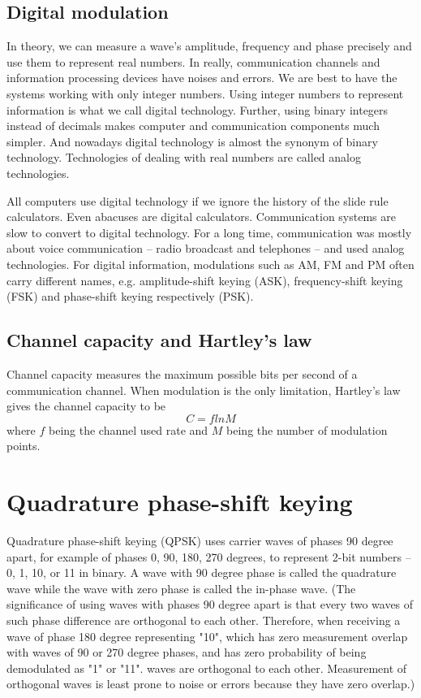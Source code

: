 \documentclass{book}
\begin{document}
\subsection{Digital modulation}
In theory, we can measure a wave's amplitude, frequency and phase precisely and use them to represent real numbers. In really, communication channels and information processing devices have noises and errors. We are best to have the systems working with only integer numbers. Using integer numbers to represent information is what we call digital technology. Further, using binary integers instead of decimals makes computer and communication components much simpler. And nowadays digital technology is almost the synonym of binary technology. Technologies of dealing with real numbers are called analog technologies.

All computers use digital technology if we ignore the history of the slide rule calculators. Even abacuses are digital calculators. Communication systems are slow to convert to digital technology. For a long time, communication was mostly about voice communication -- radio broadcast and telephones -- and used analog technologies. For digital information, modulations such as AM, FM and PM often carry different names, e.g. amplitude-shift keying (ASK), frequency-shift keying (FSK) and phase-shift keying respectively (PSK).

\subsection{Channel capacity and Hartley's law}
Channel capacity measures the maximum possible bits per second of a communication channel. When modulation is the only limitation, Hartley's law gives the channel capacity to be
\begin{equation}
    C = f ln M
\end{equation}
where $f$ being the channel used rate and $M$ being the number of modulation points.

\section{Quadrature phase-shift keying}
Quadrature phase-shift keying (QPSK) uses carrier waves of phases 90 degree apart, for example of phases 0, 90, 180, 270 degrees, to represent 2-bit numbers -- 0, 1, 10, or 11 in binary. A wave with 90 degree phase is called the quadrature wave while the wave with zero phase is called the in-phase wave.
(The significance of using waves with phases 90 degree apart is that every two waves of such phase difference are orthogonal to each other. Therefore, when receiving a wave of phase 180 degree representing "10", which has zero measurement overlap with waves of 90 or 270 degree phases, and has zero probability of being demodulated as "1" or "11".
waves are orthogonal to each other. Measurement of orthogonal waves is least prone to noise or errors 
because they have zero overlap.)
\end{document}
